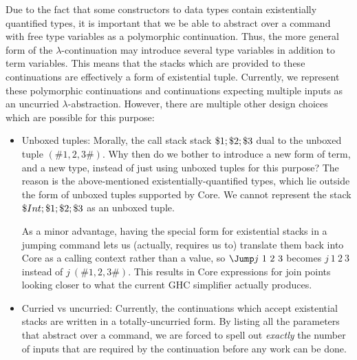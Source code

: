 \documentclass{article}
\begin{document}
Due to the fact that some constructors to data types contain existentially
quantified types, it is important that we be able to abstract over a command
with free type variables as a polymorphic continuation.  Thus, the more general
form of the $\lambda$-continuation may introduce several type variables in
addition to term variables.  This means that the stacks which are provided to
these continuations are effectively a form of existential tuple.  Currently, we
represent these polymorphic continuations and continuations expecting multiple
inputs as an uncurried $\lambda$-abstraction.  However, there are multiple other
design choices which are possible for this purpose:
\begin{itemize}
\item Unboxed tuples: Morally, the call stack stack
  $\${1};\${2};\${3}$ dual to the unboxed tuple
  $(\# 1, 2, 3 \#)$.  Why then do we bother to introduce a new form of term, and
  a new type, instead of just using unboxed tuples for this purpose?  The reason
  is the above-mentioned existentially-quantified types, which lie outside the
  form of unboxed tuples supported by Core.  We cannot represent the stack
  $\${Int};\${1};\${2};\${3}$ as an unboxed tuple.

  As a minor advantage, having the special form for existential stacks in a
  jumping command lets us (actually, requires us to) translate them back into
  Core as a calling context rather than a value, so $\jump{1 ~ 2 ~ 3}{j}$
  becomes $j ~ 1 ~ 2 ~ 3$ instead of $j ~ (\# 1, 2, 3 \#)$.  This results in Core
  expressions for join points looking closer to what the current GHC simplifier
  actually produces.

\item Curried vs uncurried: Currently, the continuations which accept
  existential stacks are written in a totally-uncurried form.  By listing all
  the parameters that abstract over a command, we are forced to spell out
  \emph{exactly} the number of inputs that are required by the continuation
  before any work can be done.


\end{itemize}
\end{document}

